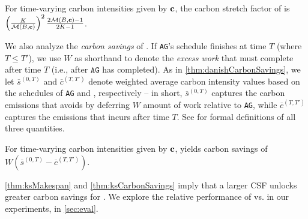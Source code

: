 \begin{thm}\label{thm:ksMakespan}
    For time-varying carbon intensities given by ${\mathbf{c}}$, the carbon stretch factor of \CAP is $\left(\frac{K}{\mathcal{M}(B, {\mathbf{c}})}\right)^2 \frac{2\mathcal{M}(B, {\mathbf{c}})-1}{2K-1}$.
\end{thm}

\noindent We also analyze the \textit{carbon savings} of \CAP.  
If \texttt{AG}'s schedule finishes at time $T$ (where $T \leq T'$), we use $W$ as shorthand to denote the \textit{excess work} that \CAP must complete after time $T$ (i.e., after $\texttt{AG}$ has completed).  
As in \autoref{thm:danishCarbonSavings}, we let $\overline{s}^{(0,T)}$ and $\overline{c}^{(T, T')}$ denote weighted average carbon intensity values based on the schedules of \texttt{AG} and \CAP, respectively -- in short, $\overline{s}^{(0,T)}$ captures the carbon emissions that \CAP avoids by deferring $W$ amount of work relative to \texttt{AG}, while $\overline{c}^{(T, T')}$ captures the emissions that \CAP incurs after time $T$.  
See  for formal definitions of all three quantities.

\begin{thm}\label{thm:ksCarbonSavings}
   For time-varying carbon intensities given by ${\mathbf{c}}$, \CAP yields carbon savings of $W ( \overline{s}^{(0,T)} - \overline{c}^{(T, T')} )$.
\end{thm}

\noindent \autoref{thm:ksMakespan} and \ref{thm:ksCarbonSavings} imply that a larger CSF unlocks greater carbon savings for \CAP.  We explore the relative performance of \PCAPS vs. \CAP in our experiments, in \autoref{sec:eval}.





















